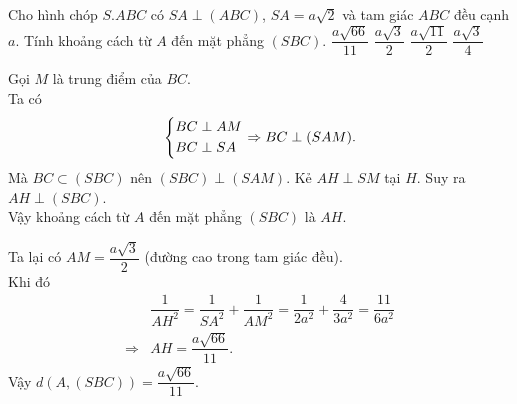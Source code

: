 \begin{ex}%
 Cho hình chóp $S.ABC$ có $SA \perp (ABC)$, $SA = a\sqrt{2}$ và tam giác $ABC$ đều cạnh $a$. Tính khoảng cách từ $A$ đến mặt phẳng $(SBC)$.
 \choice
  {\True $\dfrac{a \sqrt{66}}{11}$}
  {$\dfrac{a \sqrt{3}}{2}$}
  {$\dfrac{a \sqrt{11}}{2}$}
  {$\dfrac{a \sqrt{3}}{4}$}
 \loigiai
  {
  \immini
  {
  Gọi $M$ là trung điểm của $BC$.\\
  Ta có
  \begin{align*}
   \left\{\begin{aligned}& BC \perp AM \\& BC \perp SA\end{aligned}\right. \Rightarrow BC \perp (SAM).
  \end{align*}
  Mà $BC \subset (SBC)$ nên $(SBC) \perp (SAM)$.
  Kẻ $AH \perp SM$ tại $H$. Suy ra $AH \perp (SBC)$.\\
  Vậy khoảng cách từ $A$ đến mặt phẳng $(SBC)$ là $AH$.\\
  }
  {
  }
  \noindent
  Ta lại có $AM = \dfrac{a \sqrt{3}}{2}$ (đường cao trong tam giác đều).\\
  Khi đó
  \begin{align*}
   & \dfrac{1}{AH^2} = \dfrac{1}{SA^2} + \dfrac{1}{AM^2} = \dfrac{1}{2a^2} + \dfrac{4}{3a^2} = \dfrac{11}{6a^2}\\
   \Rightarrow & AH = \dfrac{a \sqrt{66}}{11}.
  \end{align*}
  Vậy $d(A, (SBC)) = \dfrac{a \sqrt{66}}{11}$.
  }
\end{ex}


